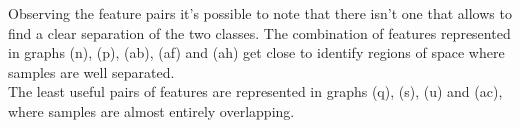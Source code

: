 \documentclass[12pt,a4paper]{article}
\begin{document}
% 
% 

Observing the feature pairs it's possible to note that there isn't one that allows to find a clear separation of the two classes. 
\vspace*{0.5cm}
The combination of features represented in graphs (n), (p), (ab), (af) and (ah) get close to identify regions of space where samples are well separated.
\vspace*{0.5cm}\\
The least useful pairs of features are represented in graphs (q), (s), (u) and (ac), where samples are almost entirely overlapping.


\clearpage


\end{document}

